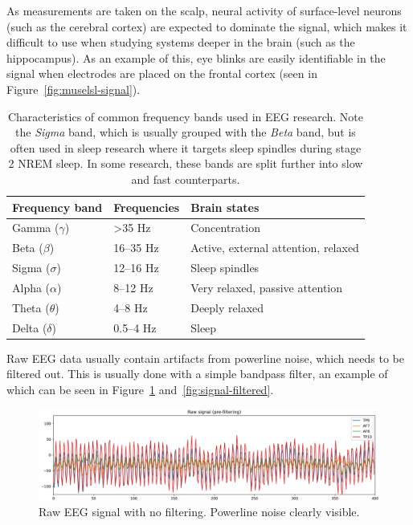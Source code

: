     As measurements are taken on the scalp, neural activity of surface-level neurons (such as the cerebral cortex) are expected to dominate the signal, which makes it difficult to use when studying systems deeper in the brain (such as the hippocampus). As an example of this, eye blinks are easily identifiable in the signal when electrodes are placed on the frontal cortex (seen in Figure~\ref{fig:muselsl-signal}).

    \begin{table}
        \centering
        \begin{tabular}{lll}
            \toprule
            Frequency band & Frequencies & Brain states \\
            \midrule
            Gamma ($\gamma$) & >35 Hz & Concentration \\
            Beta ($\beta$) & 16--35 Hz & Active, external attention, relaxed \\
            Sigma ($\sigma$) & 12--16 Hz & Sleep spindles \\
            Alpha ($\alpha$) & 8--12 Hz & Very relaxed, passive attention \\
            Theta ($\theta$) & 4--8 Hz & Deeply relaxed \\
            Delta ($\delta$) & 0.5--4 Hz & Sleep \\
            \bottomrule
        \end{tabular}
        \caption{Characteristics of common frequency bands used in EEG research. Note the \emph{Sigma} band, which is usually grouped with the \emph{Beta} band, but is often used in sleep research where it targets sleep spindles during stage 2 NREM sleep. In some research, these bands are split further into slow and fast counterparts.}\label{table:freq-bands}
    \end{table}


    Raw EEG data usually contain artifacts from powerline noise, which needs to be filtered out. This is usually done with a simple bandpass filter, an example of which can be seen in Figure~\ref{fig:signal-unfiltered} and~\ref{fig:signal-filtered}.
    
    \begin{figure}[H]
        \includegraphics[width=14cm]{img/raw-signal-prefilter.png}
        \caption{Raw EEG signal with no filtering. Powerline noise clearly visible.}\label{fig:signal-unfiltered}
    \end{figure}

